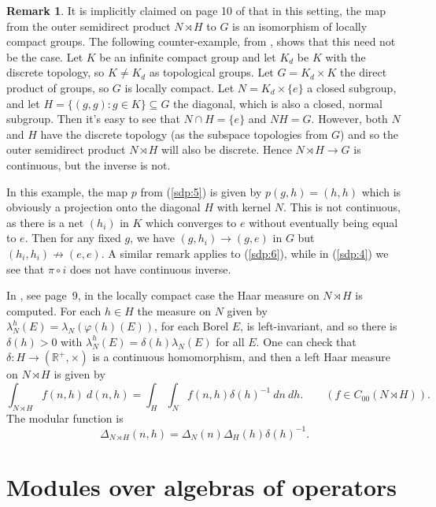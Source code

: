 \documentclass[twoside,a4paper,12pt]{article}
\theoremstyle{plain}
\theoremstyle{definition}
\newtheorem{remark}[proposition]{Remark}
\begin{document}
\begin{remark}
It is implicitly claimed on page 10 of \cite{kt} that in this setting, the map from the outer
semidirect product $N \rtimes H$ to $G$ is an isomorphism of locally compact groups.  The following
counter-example, from \cite{a3}, shows that this need not be the case.  Let $K$ be an infinite compact
group and let $K_d$ be $K$ with the discrete topology, so $K\not=K_d$ as topological groups.  Let
$G = K_d \times K$ the direct product of groups, so $G$ is locally compact.  Let $N = K_d \times \{e\}$
a closed subgroup, and let $H = \{ (g,g) : g\in K \} \subseteq G$ the diagonal, which is also a closed,
normal subgroup.  Then it's easy to see that $N\cap H=\{e\}$ and $NH = G$.  However, both $N$ and $H$ have
the discrete topology (as the subspace topologies from $G$) and so the outer semidirect product
$N \rtimes H$ will also be discrete.  Hence $N\rtimes H\rightarrow G$ is continuous, but the inverse is
not.

In this example, the map $p$ from (\ref{sdp:5}) is given by $p(g,h) = (h,h)$ which is obviously a
projection onto the diagonal $H$ with kernel $N$.  This is not continuous, as there is a net $(h_i)$ in
$K$ which converges to $e$ without eventually being equal to $e$.  Then for any fixed $g$, we have
$(g,h_i) \rightarrow (g,e)$ in $G$ but $(h_i,h_i) \not\rightarrow (e,e)$.  A similar remark applies
to (\ref{sdp:6}), while in (\ref{sdp:4}) we see that $\pi\circ i$ does not have continuous inverse.
\end{remark}

In \cite{kt}, see page~9, in the locally compact case the Haar measure on $N \rtimes H$ is computed.
For each $h\in H$ the measure on $N$ given by $\lambda_N^h(E) = \lambda_N(\varphi(h)(E))$, for each Borel $E$,
is left-invariant, and so there is $\delta(h)>0$ with $\lambda_N^h(E) = \delta(h) \lambda_N(E)$ for
all $E$.  One can check that $\delta:H\rightarrow (\mathbb R^+, \times)$ is a continuous homomorphism,
and then a left Haar measure on $N \rtimes H$ is given by
\[ \int_{N \rtimes H} f(n,h) \ d(n,h) = \int_H \int_N f(n,h) \delta(h)^{-1} \ dn \ dh. 
\qquad (f\in C_{00}(N \rtimes H)). \]
The modular function is
\[ \Delta_{N \rtimes H}(n,h) = \Delta_N(n) \Delta_H(h) \delta(h)^{-1}. \]



\section{Modules over algebras of operators}
\end{document}
